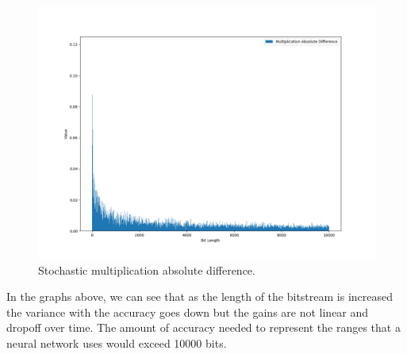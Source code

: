 \documentclass[a4paper,oneside,phd,etd]{BYUPhys}
\begin{document}
\begin{figure}[H]
\centering
\includegraphics[scale=0.4]{results/mult-abs.png}
\caption{Stochastic multiplication absolute difference.}
\label{fig:abs_mult}
\end{figure}
In the graphs above, we can see that as the length of the bitstream is increased the variance with the accuracy goes down but the gains are not linear and dropoff over time. The amount of accuracy needed to represent the ranges that a neural network uses would exceed 10000 bits.
\end{document}
